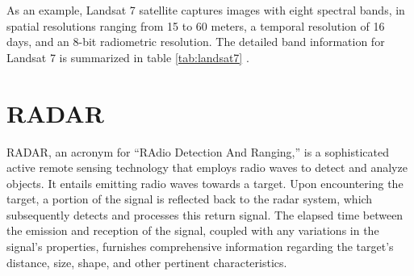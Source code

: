 \documentclass[
  12 pt,
]{Nemilov}
\begin{document}
As an example, Landsat 7 satellite captures images with eight spectral bands, in spatial resolutions ranging from 15 to 60 meters, a temporal resolution of 16 days, and an 8-bit radiometric resolution. The detailed band information for Landsat 7 is summarized in table \ref{tab:landsat7} \citep{NASAl7}.

\begin{table}[!h]
\centering
\caption{\label{tab:landsat7}Band information for Landsat 7}
\centering
{}
\end{table}

\section{RADAR}\label{radar}

RADAR, an acronym for ``RAdio Detection And Ranging,'' is a sophisticated active remote sensing technology that employs radio waves to detect and analyze objects. It entails emitting radio waves towards a target. Upon encountering the target, a portion of the signal is reflected back to the radar system, which subsequently detects and processes this return signal. The elapsed time between the emission and reception of the signal, coupled with any variations in the signal's properties, furnishes comprehensive information regarding the target's distance, size, shape, and other pertinent characteristics.
\end{document}
